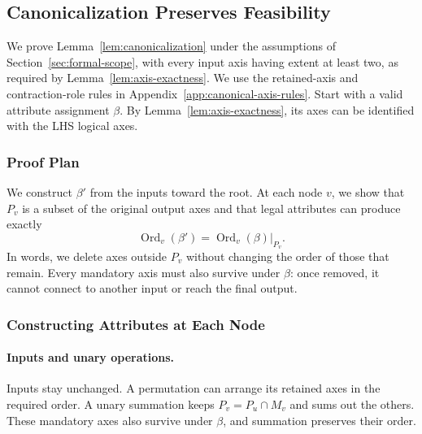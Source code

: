 \subsection{Canonicalization Preserves Feasibility}
\label{app:canonicalization-proof}
We prove Lemma~\ref{lem:canonicalization} under the assumptions of
Section~\ref{sec:formal-scope}, with every input axis having extent at least
two, as required by Lemma~\ref{lem:axis-exactness}. We use the retained-axis
and contraction-role rules in Appendix~\ref{app:canonical-axis-rules}.
Start with a valid attribute assignment
$\beta$. By Lemma~\ref{lem:axis-exactness}, its axes can be identified
with the LHS logical axes.

\subsubsection{Proof Plan}
We construct $\beta'$ from the inputs toward the root. At each node $v$,
we show that $P_v$ is a subset of the original output axes and that legal
attributes can produce exactly
\begin{equation}
 \operatorname{Ord}_v(\beta')=\operatorname{Ord}_v(\beta)|_{P_v}.
\end{equation}
In words, we delete axes outside $P_v$ without changing the order of those
that remain. Every mandatory axis must also survive under $\beta$:
once removed, it cannot connect to another input or reach the final output.

\subsubsection{Constructing Attributes at Each Node}
\paragraph{Inputs and unary operations.}
Inputs stay unchanged. A permutation can arrange its retained axes in
the required order. A unary summation keeps $P_v=P_u\cap M_v$ and sums
out the others. These mandatory axes also survive under $\beta$, and
summation preserves their order.

